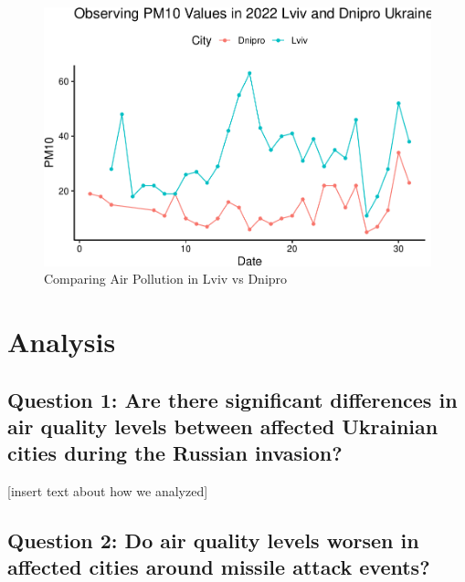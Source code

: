 \documentclass[
  12pt,
]{article}
\begin{document}
\begin{figure}
\centering
\includegraphics{Fontanie_Gordon_Weinberg_Project_files/figure-latex/Plotting Lviv vs Dnipro-2.pdf}
\caption{Comparing Air Pollution in Lviv vs Dnipro}
\end{figure}

\newpage

\hypertarget{analysis}{%
\section{Analysis}\label{analysis}}

\hypertarget{question-1-are-there-significant-differences-in-air-quality-levels-between-affected-ukrainian-cities-during-the-russian-invasion}{%
\subsection{Question 1: Are there significant differences in air quality
levels between affected Ukrainian cities during the Russian
invasion?}\label{question-1-are-there-significant-differences-in-air-quality-levels-between-affected-ukrainian-cities-during-the-russian-invasion}}

{[}insert text about how we analyzed{]}

\hypertarget{question-2-do-air-quality-levels-worsen-in-affected-cities-around-missile-attack-events}{%
\subsection{Question 2: Do air quality levels worsen in affected cities
around missile attack
events?}\label{question-2-do-air-quality-levels-worsen-in-affected-cities-around-missile-attack-events}}
\end{document}
